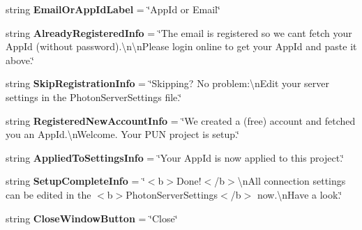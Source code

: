 \begin{DoxyCompactItemize}
\item 
string {\bfseries Email\+Or\+App\+Id\+Label} = \char`\"{}App\+Id or Email\char`\"{}\hypertarget{class_pun_wizard_text_a9f3b6fe2361497a670199d682e99575b}{}\label{class_pun_wizard_text_a9f3b6fe2361497a670199d682e99575b}

\item 
string {\bfseries Already\+Registered\+Info} = \char`\"{}The email is registered so we can\textquotesingle{}t fetch your App\+Id (without password).\textbackslash{}n\textbackslash{}n\+Please login online to get your App\+Id and paste it above.\char`\"{}\hypertarget{class_pun_wizard_text_a996ee166945229246f0165013bdf8315}{}\label{class_pun_wizard_text_a996ee166945229246f0165013bdf8315}

\item 
string {\bfseries Skip\+Registration\+Info} = \char`\"{}Skipping? No problem\+:\textbackslash{}n\+Edit your server settings in the Photon\+Server\+Settings file.\char`\"{}\hypertarget{class_pun_wizard_text_a973c1a00148edb46e50c5f3402773faf}{}\label{class_pun_wizard_text_a973c1a00148edb46e50c5f3402773faf}

\item 
string {\bfseries Registered\+New\+Account\+Info} = \char`\"{}We created a (free) account and fetched you an App\+Id.\textbackslash{}n\+Welcome. Your P\+UN project is setup.\char`\"{}\hypertarget{class_pun_wizard_text_a646ee360759be07d62f726e71e2b60cf}{}\label{class_pun_wizard_text_a646ee360759be07d62f726e71e2b60cf}

\item 
string {\bfseries Applied\+To\+Settings\+Info} = \char`\"{}Your App\+Id is now applied to this project.\char`\"{}\hypertarget{class_pun_wizard_text_af582ba8445fcb5925fa47644b5454353}{}\label{class_pun_wizard_text_af582ba8445fcb5925fa47644b5454353}

\item 
string {\bfseries Setup\+Complete\+Info} = \char`\"{}$<$b$>$Done!$<$/b$>$\textbackslash{}n\+All connection settings can be edited in the $<$b$>$Photon\+Server\+Settings$<$/b$>$ now.\textbackslash{}n\+Have a look.\char`\"{}\hypertarget{class_pun_wizard_text_a338b0f8e3a6ef07835774e3a78120d5e}{}\label{class_pun_wizard_text_a338b0f8e3a6ef07835774e3a78120d5e}

\item 
string {\bfseries Close\+Window\+Button} = \char`\"{}Close\char`\"{}\hypertarget{class_pun_wizard_text_ac309bbb1df1a12df4f603ebf0f80de1b}{}\label{class_pun_wizard_text_ac309bbb1df1a12df4f603ebf0f80de1b}


\end{DoxyCompactItemize}
